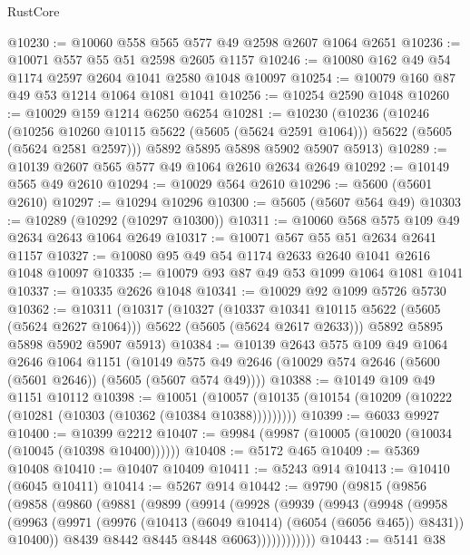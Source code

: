 \begin{lexlean}{RustCore}
\begin{coremodule}
@10230 := @10060 @558 @565 @577 @49 @2598 @2607 @1064 @2651
@10236 := @10071 @557 @55 @51 @2598 @2605 @1157
@10246 := @10080 @162 @49 @54 @1174 @2597 @2604 @1041 @2580 @1048 @10097
@10254 := @10079 @160 @87 @49 @53 @1214 @1064 @1081 @1041
@10256 := @10254 @2590 @1048
@10260 := @10029 @159 @1214 @6250 @6254
@10281 := @10230
    (@10236
      (@10246
        (@10256 @10260 @10115 @5622 (@5605 (@5624 @2591 @1064)))
        @5622
        (@5605 (@5624 @2581 @2597)))
      @5892
      @5895
      @5898
      @5902
      @5907
      @5913)
@10289 := @10139 @2607 @565 @577 @49 @1064 @2610 @2634 @2649
@10292 := @10149 @565 @49 @2610
@10294 := @10029 @564 @2610
@10296 := @5600 (@5601 @2610)
@10297 := @10294 @10296
@10300 := @5605 (@5607 @564 @49)
@10303 := @10289 (@10292 (@10297 @10300))
@10311 := @10060 @568 @575 @109 @49 @2634 @2643 @1064 @2649
@10317 := @10071 @567 @55 @51 @2634 @2641 @1157
@10327 := @10080 @95 @49 @54 @1174 @2633 @2640 @1041 @2616 @1048 @10097
@10335 := @10079 @93 @87 @49 @53 @1099 @1064 @1081 @1041
@10337 := @10335 @2626 @1048
@10341 := @10029 @92 @1099 @5726 @5730
@10362 := @10311
    (@10317
      (@10327
        (@10337 @10341 @10115 @5622 (@5605 (@5624 @2627 @1064)))
        @5622
        (@5605 (@5624 @2617 @2633)))
      @5892
      @5895
      @5898
      @5902
      @5907
      @5913)
@10384 := @10139
    @2643
    @575
    @109
    @49
    @1064
    @2646
    @1064
    @1151
    (@10149 @575 @49 @2646 (@10029 @574 @2646 (@5600 (@5601 @2646)) (@5605 (@5607 @574 @49))))
@10388 := @10149 @109 @49 @1151 @10112
@10398 := @10051
    (@10057 (@10135 (@10154 (@10209 (@10222 (@10281 (@10303 (@10362 (@10384 @10388)))))))))
@10399 := @6033 @9927
@10400 := @10399 @2212
@10407 := @9984 (@9987 (@10005 (@10020 (@10034 (@10045 (@10398 @10400))))))
@10408 := @5172 @465
@10409 := @5369 @10408
@10410 := @10407 @10409
@10411 := @5243 @914
@10413 := @10410 (@6045 @10411)
@10414 := @5267 @914
@10442 := @9790
    (@9815
      (@9856
        (@9858
          (@9860
            (@9881
              (@9899
                (@9914
                  (@9928
                    (@9939
                      (@9943
                        (@9948
                          (@9958
                            (@9963
                              (@9971
                                (@9976 (@10413 (@6049 @10414) (@6054 (@6056 @465)) @8431))
                                @10400))
                            @8439
                            @8442
                            @8445
                            @8448
                            @6063))))))))))))
@10443 := @5141 @38

\end{coremodule}
\end{lexlean}
